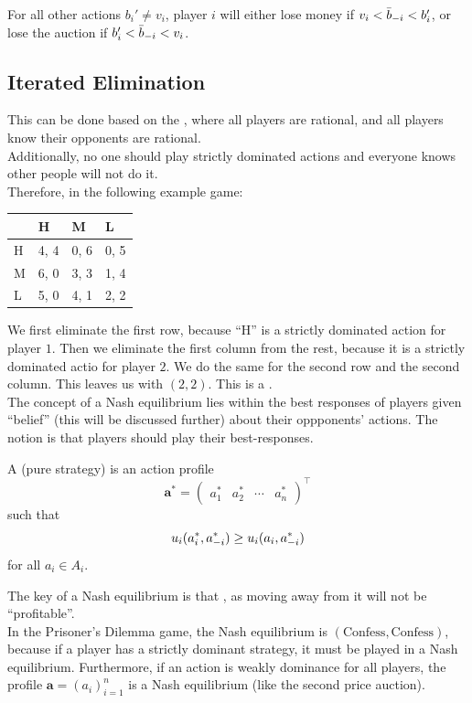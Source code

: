 For all other actions $b_i' \ne v_i$, player $i$ will either lose money if $v_i < \bar{b}_{-i} < b_i'$, or lose the auction if $b_i' < \bar{b}_{-i} < v_i$.

\subsection{Iterated Elimination}
This can be done based on the , where all players are rational, and all players know their opponents are rational. \\
Additionally, no one should play strictly dominated actions and everyone knows other people will not do it. \\
Therefore, in the following example game:
\begin{center}
    \begin{tabular}{|l|l|l|l|}
    \hline
    & H & M & L \\ \hline
    H & 4, 4 & 0, 6 & 0, 5 \\ \hline
    M & 6, 0 & 3, 3 & 1, 4 \\ \hline
    L & 5, 0 & 4, 1 & 2, 2 \\ \hline
    \end{tabular}
\end{center}
We first eliminate the first row, because ``H'' is a strictly dominated action for player $1$. Then we eliminate the first column from the rest, because it is a strictly dominated actio for player $2$. We do the same for the second row and the second column. This leaves us with $(2, 2)$. This is a . \\
The concept of a Nash equilibrium lies within the best responses of players given ``belief'' (this will be discussed further) about their oppponents' actions. The notion is that players should  play their best-responses.
\begin{definition}
    A (pure strategy)  is an action profile
    $$\mathbf{a}^* = \begin{pmatrix}
        a_1^* & a_2^* & \cdots & a_n^*
    \end{pmatrix}^\top$$
    such that
    $$u_i(a_i^*, a_{-i}^*) \ge u_i(a_i, a_{-i}^*)$$
    for all $a_i \in A_i$.
\end{definition}
The key of a Nash equilibrium is that , as moving away from it will not be ``profitable''. \\
In the Prisoner's Dilemma game, the Nash equilibrium is $(\text{Confess}, \text{Confess})$, because if a player has a strictly dominant strategy, it must be played in a Nash equilibrium. Furthermore, if an action is weakly dominance for all players, the profile $\mathbf{a} = (a_i)_{i = 1}^n$ is a Nash equilibrium (like the second price auction).

